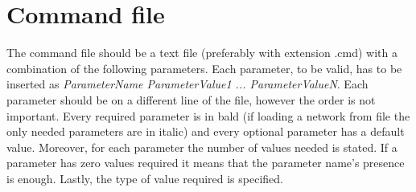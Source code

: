 \documentclass{article}
\begin{document}
\section{Command file}\label{section:command}
The command file should be a text file (preferably with extension .cmd) with a combination of the following parameters. Each parameter, to be valid, has to be inserted as \textit{ParameterName ParameterValue1 ... ParameterValueN}. Each parameter should be on a different line of the file, however the order is not important. Every required parameter is in bald (if loading a network from file the only needed parameters are in italic) and every optional parameter has a default value. Moreover, for each parameter the number of values needed is stated. If a parameter has zero values required it means that the parameter name's presence is enough. Lastly, the type of value required is specified.
\end{document}
